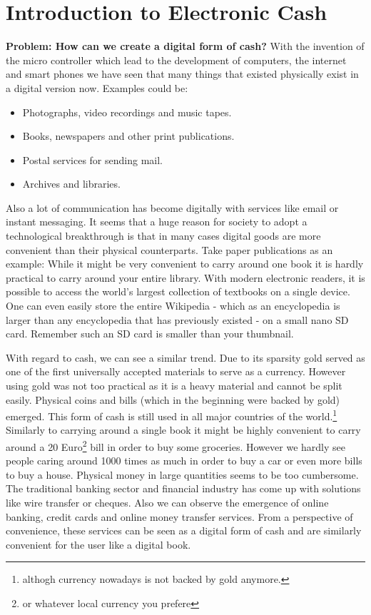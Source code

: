 \documentclass[ebook,12pt,oneside,openany]{memoir}
\newcommand{\problem}[1]{\textbf{Problem: #1}}
\begin{document}
\section{Introduction to Electronic Cash}
\problem{How can we create a digital form of cash?}
With the invention of the micro controller which lead to the development of computers, the internet and smart phones we have seen that many things that existed physically exist in a digital version now.
Examples could be:
\begin{itemize}
\item Photographs, video recordings and music tapes.
\item Books, newspapers and other print publications.
\item Postal services for sending mail.
\item Archives and libraries.
\end{itemize}
Also a lot of communication has become digitally with services like email or instant messaging.
It seems that a huge reason for society to adopt a technological breakthrough is that in many cases digital goods are more convenient than their physical counterparts.
Take paper publications as an example: While it might be very convenient to carry around one book it is hardly practical to carry around your entire library.
With modern electronic readers, it is possible to access the world's largest collection of textbooks on a single device.
One can even easily store the entire Wikipedia - which as an encyclopedia is larger than any encyclopedia that has previously existed - on a small nano SD card.
Remember such an SD card is smaller than your thumbnail.

With regard to cash, we can see a similar trend.
Due to its sparsity gold served as one of the first universally accepted materials to serve as a currency.
However using gold was not too practical as it is a heavy material and cannot be split easily.
Physical coins and bills (which in the beginning were backed by gold) emerged.
This form of cash is still used in all major countries of the world.\footnote{althogh currency nowadays is not backed by gold anymore.}
Similarly to carrying around a single book it might be highly convenient to carry around a 20 Euro\footnote{or whatever local currency you prefere} bill in order to buy some groceries. However we hardly see people caring around 1000 times as much in order to buy a car or even more bills to buy a house.
Physical money in large quantities seems to be too cumbersome. 
The traditional banking sector and financial industry has come up with solutions like wire transfer or cheques.
Also we can observe the emergence of online banking, credit cards and online money transfer services.
From a perspective of convenience, these services can be seen as a digital form of cash and are similarly convenient for the user like a digital book.
\end{document}
